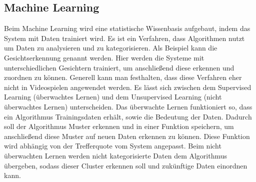 \subsection{Machine Learning}
\label{ch:Grundlagen:sec:Learning}
Beim Machine Learning wird eine statistische Wissenbasis aufgebaut, indem das System mit Daten trainiert wird. Es ist ein Verfahren, dass Algorithmen nutzt um Daten zu analysieren und zu kategorisieren. Als Beispiel kann die Gesichtserkennung genannt werden. Hier werden die Systeme mit unterschiedlichen Gesichtern trainiert, um anschließend diese erkennen und zuordnen zu können. Generell kann man festhalten, dass diese Verfahren eher nicht in Videospielen angewendet werden. Es lässt sich zwischen dem Supervised Learning (überwachtes Lernen) und dem Unsupervised Learning (nicht überwachtes Lernen) unterscheiden.
Das überwachte Lernen funktioniert so, dass ein Algorithmus Trainingsdaten erhält, sowie die Bedeutung der Daten. Dadurch soll der Algorithmus Muster erkennen und in einer Funktion speichern, um anschließend diese Muster auf neuen Daten erkennen zu können. Diese Funktion wird abhängig von der Trefferquote vom System angepasst.
Beim nicht überwachten Lernen werden nicht kategorisierte Daten dem Algorithmus übergeben, sodass dieser Cluster erkennen soll und zukünftige Daten einordnen kann.\\






